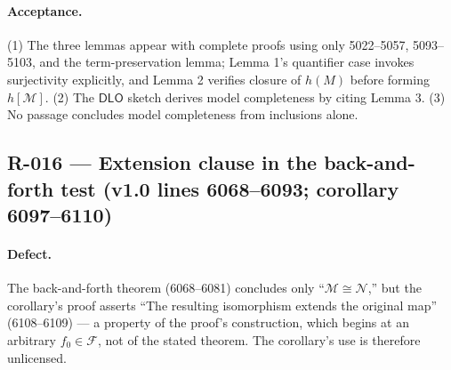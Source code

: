 \paragraph{Acceptance.} (1) The three lemmas appear with complete proofs
using only 5022--5057, 5093--5103, and the term-preservation lemma; Lemma
1's quantifier case invokes surjectivity explicitly, and Lemma 2 verifies
closure of \(h(M)\) before forming \(h[\mathcal M]\).  (2) The
\(\mathsf{DLO}\) sketch derives model completeness by citing Lemma 3.
(3) No passage concludes model completeness from inclusions alone.

\subsection*{R-016 --- Extension clause in the back-and-forth test (v1.0 lines 6068--6093; corollary 6097--6110)}

\paragraph{Defect.} The back-and-forth theorem (6068--6081) concludes only
``\(\mathcal M\cong\mathcal N\),'' but the corollary's proof asserts ``The
resulting isomorphism extends the original map'' (6108--6109) --- a
property of the proof's construction, which begins at an arbitrary
\(f_0\in\mathcal F\), not of the stated theorem.  The corollary's use is
therefore unlicensed.

